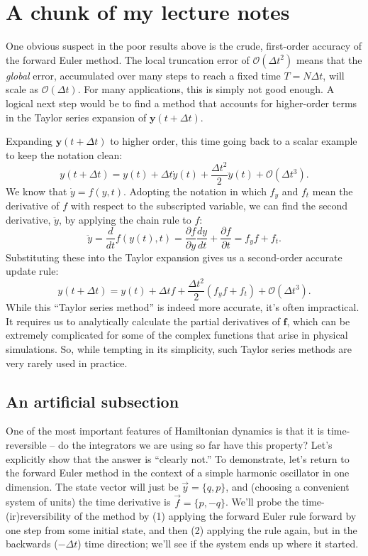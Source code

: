 \documentclass{article}
\begin{document}
\section{A chunk of my lecture notes}

One obvious suspect in the poor results above is the crude, first-order accuracy of the forward Euler method.
 The local truncation error of $\mathcal{O}(\Delta t^2)$ means that the \emph{global} error, accumulated over many steps to reach a fixed time $T = N\Delta t$, will scale as $\mathcal{O}(\Delta t)$.
 For many applications, this is simply not good enough.
A logical next step would be to find a method that accounts for higher-order terms in the Taylor series expansion of $\mathbf{y}(t+\Delta t)$.


Expanding $\mathbf{y}(t+\Delta t)$ to higher order, this time going back to a scalar example to keep the notation clean:
\begin{equation}
    y(t+\Delta t) = y(t) + \Delta t \dot{y}(t) + \frac{\Delta t^2}{2} \ddot{y}(t) + \mathcal{O}(\Delta t^3).
\end{equation}
We know that $\dot{y} = f(y,t)$.
Adopting the notation in which $f_y$ and $f_t$ mean the derivative of $f$ with respect to the subscripted variable, we can find the second derivative, $\ddot{y}$, by applying the chain rule to $f$:
\begin{equation}
    \ddot{y} = \frac{d}{dt} f(y(t), t) = \frac{\partial f}{\partial y}\frac{dy}{dt} + \frac{\partial f}{\partial t} = f_y f + f_t.
\end{equation}
Substituting these into the Taylor expansion gives us a second-order accurate update rule:
\begin{equation}
    y(t+\Delta t) = y(t) + \Delta t f + \frac{\Delta t^2}{2} (f_y f + f_t) + \mathcal{O}(\Delta t^3).
\end{equation}
While this ``Taylor series method'' is indeed more accurate, it's often impractical.
It requires us to analytically calculate the partial derivatives of $\mathbf{f}$, which can be extremely complicated for some of the complex functions that arise in physical simulations.
So, while tempting in its simplicity, such Taylor series methods are very rarely used in practice.

\subsection{An artificial subsection}

One of the most important features of Hamiltonian dynamics is that it is time-reversible -- do the integrators we are using so far have this property?
Let's explicitly show that the answer is ``clearly not.''
To demonstrate, let's return to the forward Euler method in the context of a simple harmonic oscillator in one dimension.
The state vector will just be $\vec{y} = \{q, p\}$, and (choosing a convenient system of units) the time derivative is $\vec{f} = \{p, -q\}$. 
We'll probe the time-(ir)reversibility of the method by (1) applying the forward Euler rule forward by one step from some initial state, and then (2) applying the rule again, but in the backwards ($-\Delta t$) time direction; we'll see if the system ends up where it started.
\end{document}
